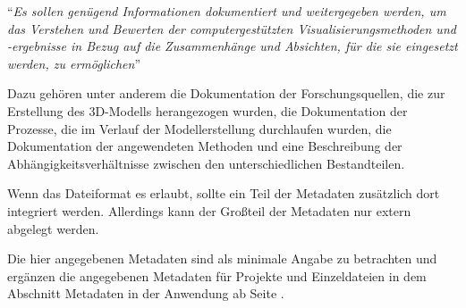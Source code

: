 "`\emph{Es sollen genügend Informationen dokumentiert und weitergegeben werden, um das Verstehen und Bewerten der computergestützten Visualisierungsmethoden und -ergebnisse in Bezug auf die Zusammenhänge und Absichten, für die sie eingesetzt werden, zu ermöglichen}"'

Dazu gehören unter anderem die Dokumentation der Forschungsquellen, die zur Erstellung des 3D-Modells herangezogen wurden, die Dokumentation der Prozesse, die im Verlauf der Modellerstellung durchlaufen wurden, die Dokumentation der angewendeten Methoden und eine Beschreibung der Abhängigkeitsverhältnisse zwischen den unterschiedlichen Bestandteilen. 

Wenn das Dateiformat es erlaubt, sollte ein Teil der Metadaten zusätzlich dort integriert werden. Allerdings kann der Großteil der Metadaten nur extern abgelegt werden.

Die hier angegebenen Metadaten sind als minimale Angabe zu betrachten und ergänzen die angegebenen Metadaten für Projekte und Einzeldateien in dem Abschnitt Metadaten in der Anwendung ab Seite \pageref{Metadaten-anwendung}.

